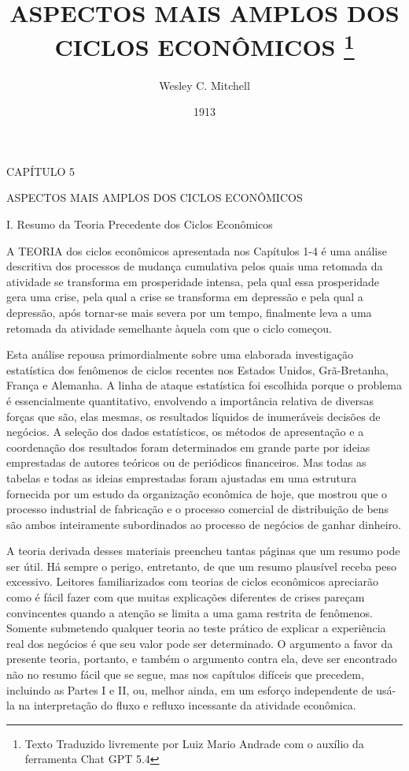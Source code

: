\documentclass[12pt]{article}
\title{ASPECTOS MAIS AMPLOS DOS CICLOS ECONÔMICOS \thanks{Texto Traduzido livremente por Luiz Mario Andrade com o auxílio da ferramenta Chat GPT 5.4}}
\author{Wesley C. Mitchell}
\date{1913}
\begin{document}
\maketitle

CAPÍTULO 5

ASPECTOS MAIS AMPLOS DOS CICLOS ECONÔMICOS

I. Resumo da Teoria Precedente dos Ciclos Econômicos

A TEORIA dos ciclos econômicos apresentada nos Capítulos 1-4 é uma análise descritiva dos processos de mudança cumulativa pelos quais uma retomada da atividade se transforma em prosperidade intensa, pela qual essa prosperidade gera uma crise, pela qual a crise se transforma em depressão e pela qual a depressão, após tornar-se mais severa por um tempo, finalmente leva a uma retomada da atividade semelhante àquela com que o ciclo começou.

Esta análise repousa primordialmente sobre uma elaborada investigação estatística dos fenômenos de ciclos recentes nos Estados Unidos, Grã-Bretanha, França e Alemanha. A linha de ataque estatística foi escolhida porque o problema é essencialmente quantitativo, envolvendo a importância relativa de diversas forças que são, elas mesmas, os resultados líquidos de inumeráveis decisões de negócios. A seleção dos dados estatísticos, os métodos de apresentação e a coordenação dos resultados foram determinados em grande parte por ideias emprestadas de autores teóricos ou de periódicos financeiros. Mas todas as tabelas e todas as ideias emprestadas foram ajustadas em uma estrutura fornecida por um estudo da organização econômica de hoje, que mostrou que o processo industrial de fabricação e o processo comercial de distribuição de bens são ambos inteiramente subordinados ao processo de negócios de ganhar dinheiro.

A teoria derivada desses materiais preencheu tantas páginas que um resumo pode ser útil. Há sempre o perigo, entretanto, de que um resumo plausível receba peso excessivo. Leitores familiarizados com teorias de ciclos econômicos apreciarão como é fácil fazer com que muitas explicações diferentes de crises pareçam convincentes quando a atenção se limita a uma gama restrita de fenômenos. Somente submetendo qualquer teoria ao teste prático de explicar a experiência real dos negócios é que seu valor pode ser determinado. O argumento a favor da presente teoria, portanto, e também o argumento contra ela, deve ser encontrado não no resumo fácil que se segue, mas nos capítulos difíceis que precedem, incluindo as Partes I e II, ou, melhor ainda, em um esforço independente de usá-la na interpretação do fluxo e refluxo incessante da atividade econômica.
\end{document}
